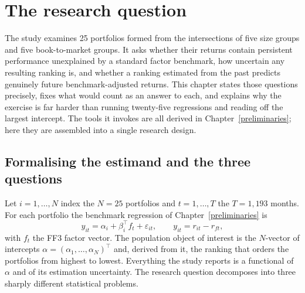 \hypertarget{question}{}
\hypertarget{the-research-question}{%
\chapter{The research question}\label{the-research-question}}

The study examines 25 portfolios formed from the intersections of five
size groups and five book-to-market groups. It asks whether their
returns contain persistent performance unexplained by a standard factor
benchmark, how uncertain any resulting ranking is, and whether a ranking
estimated from the past predicts genuinely future benchmark-adjusted
returns. This chapter states those questions precisely, fixes what would
count as an answer to each, and explains why the exercise is far harder
than running twenty-five regressions and reading off the largest
intercept. The tools it invokes are all derived in Chapter~\ref{preliminaries};
here they are assembled into a single research design.

\section{Formalising the estimand and the three questions}\label{rq-estimand}

Let $i=1,\dots,N$ index the $N=25$ portfolios and $t=1,\dots,T$ the
$T=1{,}193$ months. For each portfolio the benchmark regression of
Chapter~\ref{preliminaries} is
\begin{equation}\label{eq:rq-model}
y_{it}=\alpha_i+\beta_i^{\top}f_t+\varepsilon_{it},\qquad
y_{it}=r_{it}-r_{ft},
\end{equation}
with $f_t$ the FF3 factor vector. The population object of interest is the
$N$-vector of intercepts $\alpha=(\alpha_1,\dots,\alpha_N)^{\top}$ and,
derived from it, the ranking that orders the portfolios from highest to
lowest. Everything the study reports is a functional of $\alpha$ and of
its estimation uncertainty. The research question decomposes into three
sharply different statistical problems.

